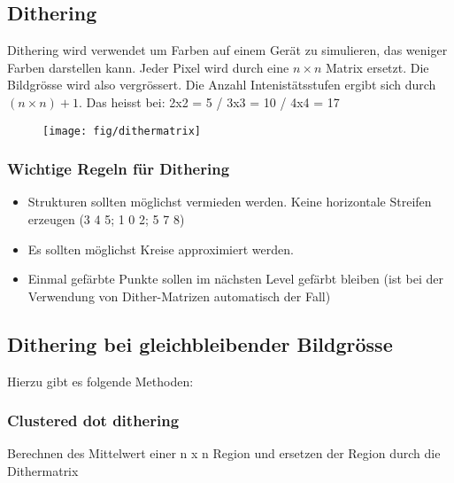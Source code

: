 \subsection{Dithering} 
Dithering wird verwendet um Farben auf einem Gerät zu simulieren, das weniger Farben darstellen kann. Jeder Pixel wird durch eine \(n \times n\)  Matrix ersetzt. Die Bildgrösse wird also vergrössert. Die Anzahl Intenistätsstufen ergibt sich durch  \((n \times n) + 1 \). Das heisst bei: 2x2 = 5 / 3x3 = 10 / 4x4 = 17
\begin{figure}[!ht]
\centering
\texttt{[image: fig/dithermatrix]}
\label{fig:dithermatrix}
\end{figure}

\subsubsection{Wichtige Regeln für Dithering}
\begin{itemize}
    \item Strukturen sollten möglichst vermieden werden. Keine horizontale Streifen erzeugen (3 4 5; 1 0 2; 5 7 8)
    \item Es sollten möglichst Kreise approximiert werden.
    \item Einmal gefärbte Punkte sollen im nächsten Level gefärbt bleiben (ist bei der Verwendung von Dither-Matrizen automatisch der Fall)
\end{itemize}





\subsection{Dithering bei gleichbleibender Bildgrösse}
Hierzu gibt es folgende Methoden:
\subsubsection{Clustered dot dithering}
Berechnen des Mittelwert einer n x n Region und ersetzen der Region durch die Dithermatrix



